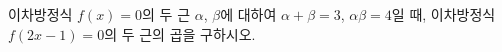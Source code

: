 이차방정식 $f(x)=0$의 두 근 $\alpha$, $\beta$에 대하여 $\alpha+\beta=3$, $\alpha\beta=4$일 때, 이차방정식 $f(2x-1)=0$의 두 근의 곱을 구하시오.
